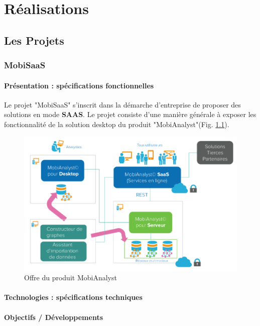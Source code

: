 \chapter{Réalisations}
\label{Developpement}


\section{Les Projets}

\subsection{MobiSaaS}

\subsubsection{Présentation : spécifications fonctionnelles}

Le projet "MobiSaaS" s'inscrit dans la démarche d'entreprise de proposer des solutions en mode \textbf{SAAS}. Le projet consiste d'une manière générale à exposer les fonctionnalité de la solution desktop du produit "MobiAnalyst"(Fig. \ref{OffreMobiAnalyst}).

\begin{figure}[!h]
\centering
\includegraphics[width=14cm]{images/offre_MobiAnalyst.png}
\caption{\label{OffreMobiAnalyst}Offre du produit MobiAnalyst}
\end{figure} 

\subsubsection{Technologies : spécifications techniques}

\subsubsection{Objectifs / Développements}

